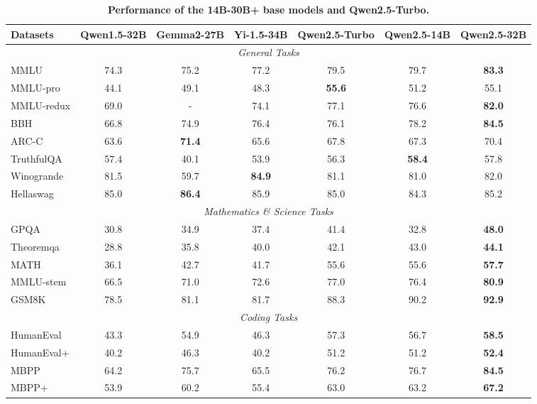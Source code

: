 \documentclass{article}
\begin{document}
\begin{table}[tbp]
\centering
\caption{\textbf{Performance of the 14B-30B+ base models and Qwen2.5-Turbo.}}
\label{tab:base-14B}
\small 
\setlength{\tabcolsep}{3pt} 
\renewcommand{\arraystretch}{0.9} 
\begin{tabular}{@{}lcccccc@{}}
\toprule
\textbf{Datasets} & \textbf{Qwen1.5-32B} & \textbf{Gemma2-27B} & \textbf{Yi-1.5-34B} & \textbf{Qwen2.5-Turbo} & \textbf{Qwen2.5-14B} & \textbf{Qwen2.5-32B} \\
\midrule
\multicolumn{7}{c}{\textit{General Tasks}} \\
\midrule
MMLU          & 74.3 & 75.2 & 77.2 & 79.5 & 79.7 & \textbf{83.3} \\
MMLU-pro      & 44.1 & 49.1 & 48.3 & \textbf{55.6} & 51.2 & 55.1 \\
MMLU-redux    & 69.0 & -    & 74.1 & 77.1 & 76.6 & \textbf{82.0} \\
BBH           & 66.8 & 74.9 & 76.4 & 76.1 & 78.2 & \textbf{84.5} \\
ARC-C         & 63.6 & \textbf{71.4} & 65.6 & 67.8 & 67.3 & 70.4 \\
TruthfulQA    & 57.4 & 40.1 & 53.9 & 56.3 & \textbf{58.4} & 57.8 \\
Winogrande    & 81.5 & 59.7 & \textbf{84.9} & 81.1 & 81.0    & 82.0 \\
Hellaswag     & 85.0 & \textbf{86.4} & 85.9 & 85.0 & 84.3    & 85.2 \\
\midrule
\multicolumn{7}{c}{\textit{Mathematics \& Science Tasks}} \\
\midrule
GPQA          & 30.8 & 34.9 & 37.4 & 41.4 & 32.8 & \textbf{48.0} \\
Theoremqa     & 28.8 & 35.8 & 40.0 & 42.1 & 43.0 & \textbf{44.1} \\
MATH          & 36.1 & 42.7 & 41.7 & 55.6 & 55.6 & \textbf{57.7} \\
MMLU-stem     & 66.5 & 71.0 & 72.6 & 77.0 & 76.4 & \textbf{80.9} \\
GSM8K         & 78.5 & 81.1 & 81.7 & 88.3 & 90.2 & \textbf{92.9} \\
\midrule
\multicolumn{7}{c}{\textit{Coding Tasks}} \\
\midrule
HumanEval     & 43.3 & 54.9 & 46.3 & 57.3 & 56.7 & \textbf{58.5} \\
HumanEval+    & 40.2 & 46.3 & 40.2 & 51.2 & 51.2 & \textbf{52.4} \\
MBPP          & 64.2 & 75.7 & 65.5 & 76.2 & 76.7 & \textbf{84.5} \\
MBPP+         & 53.9 & 60.2 & 55.4 & 63.0 & 63.2 & \textbf{67.2} \\

\end{tabular}
\end{table}
\end{document}
